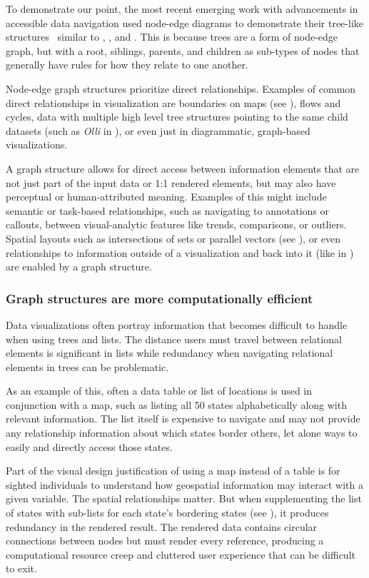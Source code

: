 \documentclass[12pt]{cmuthesis}
\begin{document}
To demonstrate our point, the most recent emerging work with advancements in accessible data navigation used node-edge diagrams to demonstrate their tree-like structures~\cite{Zong2022Rich, Thompson2023Chart} similar to , , and . This is because trees are a form of node-edge graph, but with a root, siblings, parents, and children as sub-types of nodes that generally have rules for how they relate to one another. 

Node-edge graph structures prioritize direct relationships. Examples of common direct relationships in visualization are boundaries on maps (see ), flows and cycles, data with multiple high level tree structures pointing to the same child datasets (such as \textit{Olli} in ), or even just in diagrammatic, graph-based visualizations.

A graph structure allows for direct access between information elements that are not just part of the input data or 1:1 rendered elements, but may also have perceptual or human-attributed meaning. Examples of this might include semantic or task-based relationships, such as navigating to annotations or callouts, between visual-analytic features like trends, comparisons, or outliers. Spatial layouts such as intersections of sets or parallel vectors (see ), or even relationships to information outside of a visualization and back into it (like in ) are enabled by a graph structure.

\subsubsection{Graph structures are more computationally efficient}

Data visualizations often portray information that becomes difficult to handle when using trees and lists. The distance users must travel between relational elements is significant in lists while redundancy when navigating relational elements in trees can be problematic.

As an example of this, often a data table or list of locations is used in conjunction with a map, such as listing all 50 states alphabetically along with relevant information. The list itself is expensive to navigate and may not provide any relationship information about which states border others, let alone ways to easily and directly access those states.

Part of the visual design justification of using a map instead of a table is for sighted individuals to understand how geospatial information may interact with a given variable. The spatial relationships matter. But when supplementing the list of states with sub-lists for each state's bordering states (see ), it produces redundancy in the rendered result. The rendered data contains circular connections between nodes but must render every reference, producing a computational resource creep and cluttered user experience that can be difficult to exit.
\end{document}
